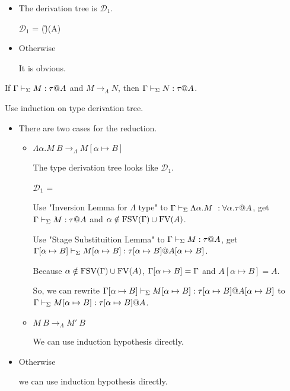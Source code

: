 \begin{itemize}
	\newcommand{\MC}[1]{\mathcal{#1}}
	\item \TGen

	      The derivation tree is $\MC{D}_1$.

	      $\MC{D}_1$ = 
	      { \andalso \alpha \notin \FTV(\G)\cup\FTV(A)}

	\item Otherwise

	      It is obvious.
\end{itemize}

\begin{theorem}
	If $\G\V M:\tau@A$ and $M \longrightarrow_{\Lambda} N$, then $\G\V N:\tau@A$.
\end{theorem}

Use induction on type derivation tree.

\begin{itemize}
	\newcommand{\R}{\longrightarrow_{\Lambda}}
	\item \TIns

	      There are two cases for the reduction.
	      \begin{itemize}
		      \item $\Lambda\alpha.M\ B \R M[\alpha \mapsto B]$

		            The type derivation tree looks like $\mathcal{D}_1$.

		            $\mathcal{D}_1$ = 
		            {}

		            Use "Inversion Lemma for $\Lambda$ type" to $\Gamma \vdash_\Sigma \Lambda\alpha.M\ : \forall\alpha.\tau @ A$,
		            get $\Gamma \vdash_\Sigma M : \tau @ A$ and $\alpha \notin \text{FSV}(\Gamma) \cup \text{FV}(A)$.

		            Use "Stage Substituition Lemma" to $\Gamma \vdash_\Sigma M : \tau @ A$,
		            get $\Gamma[\alpha \mapsto B] \vdash_\Sigma M[\alpha \mapsto B] : \tau[\alpha \mapsto B] @ A[\alpha \mapsto B]$.

		            Because $\alpha \notin \text{FSV}(\Gamma) \cup \text{FV}(A)$, $\Gamma[\alpha \mapsto B] = \Gamma$ and $A[\alpha \mapsto B] = A$.

		            So, we can rewrite $\Gamma[\alpha \mapsto B] \vdash_\Sigma M[\alpha \mapsto B] : \tau[\alpha \mapsto B] @ A[\alpha \mapsto B]$ to
		            $\Gamma \vdash_\Sigma M[\alpha \mapsto B] : \tau[\alpha \mapsto B] @ A$.
		      \item $M\ B \R M'\ B$

		            We can use induction hypothesis directly.
	      \end{itemize}

	\item Otherwise

	      we can use induction hypothesis directly.
\end{itemize}


